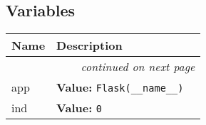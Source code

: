   \subsection{Variables}

    \vspace{-1cm}
\hspace{\varindent}\begin{longtable}{|p{\varnamewidth}|p{\vardescrwidth}|l}
\cline{1-2}
\cline{1-2} \centering \textbf{Name} & \centering \textbf{Description}& \\
\cline{1-2}
\endhead\cline{1-2}\multicolumn{3}{r}{\small\textit{continued on next page}}\\\endfoot\cline{1-2}
\endlastfoot\raggedright a\-p\-p\- & \raggedright \textbf{Value:} 
{\tt Flask(\_\_name\_\_)}&\\
\cline{1-2}
\raggedright i\-n\-d\- & \raggedright \textbf{Value:} 
{\tt 0}&\\
\cline{1-2}
\end{longtable}

